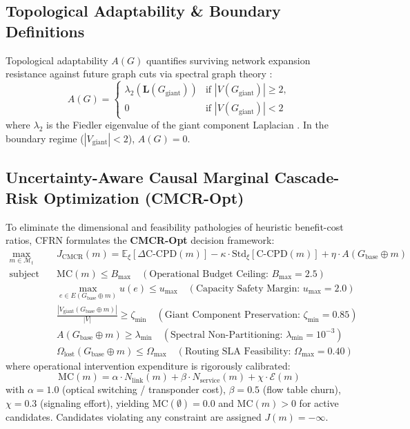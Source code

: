 \documentclass[pdflatex,sn-mathphys-num]{sn-jnl}
\theoremstyle{thmstyleone}
\theoremstyle{thmstyletwo}
\theoremstyle{thmstylethree}
\begin{document}
\subsection{Topological Adaptability \& Boundary Definitions}
Topological adaptability $A(G)$ quantifies surviving network expansion resistance against future graph cuts via spectral graph theory \cite{fiedler1973algebraic,chung1997spectral}:
\begin{equation}
A(G) = \begin{cases}
\lambda_2(\mathbf{L}(G_{\mathrm{giant}})) & \text{if } |V(G_{\mathrm{giant}})| \ge 2, \\
0 & \text{if } |V(G_{\mathrm{giant}})| < 2
\end{cases}
\end{equation}
where $\lambda_2$ is the Fiedler eigenvalue of the giant component Laplacian \cite{fiedler1973algebraic}. In the boundary regime ($|V_{\mathrm{giant}}| < 2$), $A(G) = 0$.

\subsection{Uncertainty-Aware Causal Marginal Cascade-Risk Optimization (CMCR-Opt)}
To eliminate the dimensional and feasibility pathologies of heuristic benefit-cost ratios, CFRN formulates the \textbf{CMCR-Opt} decision framework:
\begin{align}
\max_{m \in \mathcal{M}_t} \quad & J_{\mathrm{CMCR}}(m) = \mathbb{E}_\xi [\Delta \mathrm{C\text{-}CPD}(m)] - \kappa \cdot \mathrm{Std}_\xi [\mathrm{C\text{-}CPD}(m)] + \eta \cdot A(G_{\mathrm{base}} \oplus m) \\
\text{subject to:} \quad & \mathrm{MC}(m) \le B_{\max} \quad (\text{Operational Budget Ceiling: } B_{\max} = 2.5) \nonumber \\
& \max_{e \in E(G_{\mathrm{base}} \oplus m)} u(e) \le u_{\max} \quad (\text{Capacity Safety Margin: } u_{\max} = 2.0) \nonumber \\
& \frac{|V_{\mathrm{giant}}(G_{\mathrm{base}} \oplus m)|}{|V|} \ge \zeta_{\min} \quad (\text{Giant Component Preservation: } \zeta_{\min} = 0.85) \nonumber \\
& A(G_{\mathrm{base}} \oplus m) \ge \lambda_{\min} \quad (\text{Spectral Non-Partitioning: } \lambda_{\min} = 10^{-3}) \nonumber \\
& \Omega_{\mathrm{lost}}(G_{\mathrm{base}} \oplus m) \le \Omega_{\max} \quad (\text{Routing SLA Feasibility: } \Omega_{\max} = 0.40) \nonumber
\end{align}
where operational intervention expenditure is rigorously calibrated:
\begin{equation}
\mathrm{MC}(m) = \alpha \cdot N_{\mathrm{link}}(m) + \beta \cdot N_{\mathrm{service}}(m) + \chi \cdot \mathcal{E}(m)
\end{equation}
with $\alpha = 1.0$ (optical switching / transponder cost), $\beta = 0.5$ (flow table churn), $\chi = 0.3$ (signaling effort), yielding $\mathrm{MC}(\emptyset) = 0.0$ and $\mathrm{MC}(m) > 0$ for active candidates. Candidates violating any constraint are assigned $J(m) = -\infty$.
\end{document}
